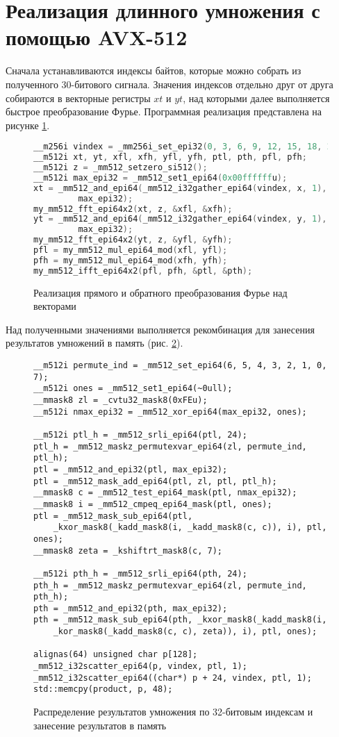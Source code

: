 \section{Реализация длинного умножения с помощью AVX-512}
Сначала устанавливаются индексы байтов, которые можно собрать из полученного 30-битового сигнала.
Значения индексов отдельно друг от друга собираются в векторные регистры $xt$ и $yt$, над которыми далее выполняется быстрое преобразование Фурье.
Программная реализация представлена на рисунке \ref{fig: vectorized ntt}.
\begin{figure}
\begin{lstlisting}[language=C]
__m256i vindex = _mm256i_set_epi32(0, 3, 6, 9, 12, 15, 18, 21);
__m512i xt, yt, xfl, xfh, yfl, yfh, ptl, pth, pfl, pfh;
__m512i z = _mm512_setzero_si512();
__m512i max_epi32 = _mm512_set1_epi64(0x00ffffffu);
xt = _mm512_and_epi64(_mm512_i32gather_epi64(vindex, x, 1),
         max_epi32);
my_mm512_fft_epi64x2(xt, z, &xfl, &xfh);
yt = _mm512_and_epi64(_mm512_i32gather_epi64(vindex, y, 1),
         max_epi32);
my_mm512_fft_epi64x2(yt, z, &yfl, &yfh);
pfl = my_mm512_mul_epi64_mod(xfl, yfl);
pfh = my_mm512_mul_epi64_mod(xfh, yfh);
my_mm512_ifft_epi64x2(pfl, pfh, &ptl, &pth);
\end{lstlisting}
\caption{Реализация прямого и обратного преобразования Фурье над векторами}
\label{fig: vectorized ntt}
\end{figure}

Над полученными значениями выполняется рекомбинация для занесения результатов умножений в память (рис. \ref{fig: 32 bit vectorized recombination}).
\begin{figure}
\begin{lstlisting}[language={[11]C++}]
__m512i permute_ind = _mm512_set_epi64(6, 5, 4, 3, 2, 1, 0, 7);
__m512i ones = _mm512_set1_epi64(~0ull);
__mmask8 zl = _cvtu32_mask8(0xFEu);
__m512i nmax_epi32 = _mm512_xor_epi64(max_epi32, ones);

__m512i ptl_h = _mm512_srli_epi64(ptl, 24);
ptl_h = _mm512_maskz_permutexvar_epi64(zl, permute_ind, ptl_h);
ptl = _mm512_and_epi32(ptl, max_epi32);
ptl = _mm512_mask_add_epi64(ptl, zl, ptl, ptl_h);
__mmask8 c = _mm512_test_epi64_mask(ptl, nmax_epi32);
__mmask8 i = _mm512_cmpeq_epi64_mask(ptl, ones);
ptl = _mm512_mask_sub_epi64(ptl,
	_kxor_mask8(_kadd_mask8(i, _kadd_mask8(c, c)), i), ptl, ones);
__mmask8 zeta = _kshiftrt_mask8(c, 7);

__m512i pth_h = _mm512_srli_epi64(pth, 24);
pth_h = _mm512_maskz_permutexvar_epi64(zl, permute_ind, pth_h);
pth = _mm512_and_epi32(pth, max_epi32);
pth = _mm512_mask_sub_epi64(pth, _kxor_mask8(_kadd_mask8(i,
	_kor_mask8(_kadd_mask8(c, c), zeta)), i), ptl, ones);

alignas(64) unsigned char p[128];
_mm512_i32scatter_epi64(p, vindex, ptl, 1);
_mm512_i32scatter_epi64((char*) p + 24, vindex, ptl, 1);
std::memcpy(product, p, 48);
\end{lstlisting}
\caption{Распределение результатов умножения по 32-битовым индексам и занесение результатов в память}
\label{fig: 32 bit vectorized recombination}
\end{figure}

